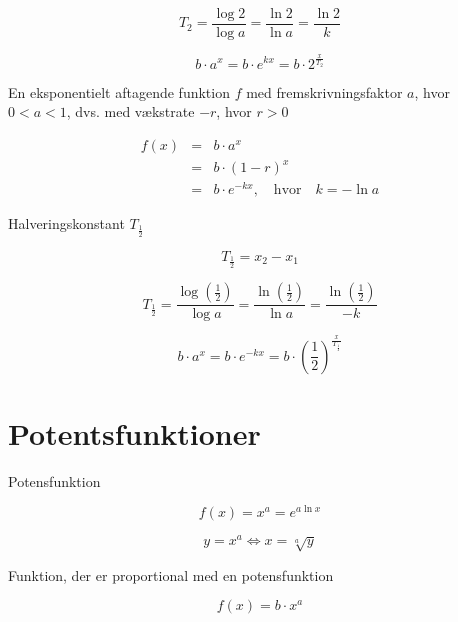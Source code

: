 \documentclass[11pt,a4paper,landscape,twocolumn,fleqn,leqno]{article}
\begin{document}
\begin{equation}
T_2 = \frac{\log 2}{\log a} = \frac{\ln 2}{\ln a} = \frac{\ln 2}{k}
\end{equation}

\begin{equation}
b \cdot a^x = b \cdot e^{kx} = b \cdot 2^{\frac{x}{T_2}}
\end{equation}

En eksponentielt aftagende funktion $f$ med fremskrivningsfaktor $a$, hvor $0 < a < 1$, dvs. med vækstrate $-r$, hvor $r > 0$

\begin{eqnarray}
f(x) & = & b \cdot a^x \\
 & = & b \cdot (1-r)^x \nonumber \\
 & = & b \cdot e^{-kx}, \quad \text{hvor} \quad k = -\ln a \nonumber
\end{eqnarray}

Halveringskonstant $T_{\frac{1}{2}}$

\begin{equation}
T_{\frac{1}{2}} = x_2 - x_1
\end{equation}

\begin{equation}
T_{\frac{1}{2}} = \frac{\log\left(\frac{1}{2}\right)}{\log a} = \frac{\ln\left(\frac{1}{2}\right)}{\ln a} = \frac{\ln\left(\frac{1}{2}\right)}{-k}
\end{equation}

\begin{equation}
b \cdot a^x = b \cdot e^{-kx} = b \cdot \left(\frac{1}{2}\right)^{\frac{x}{T_{\frac{1}{2}}}}
\end{equation}

\section{Potentsfunktioner}

Potensfunktion

\begin{equation}
f(x) = x^a = e^{a\ln x}
\end{equation}

\begin{equation}
y = x^a \Leftrightarrow x = \sqrt[a]{y}
\end{equation}

Funktion, der er proportional med en potensfunktion

\begin{equation}
f(x) = b \cdot x^a
\end{equation}
\end{document}
